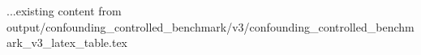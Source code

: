 ...existing content from output/confounding_controlled_benchmark/v3/confounding_controlled_benchmark_v3_latex_table.tex